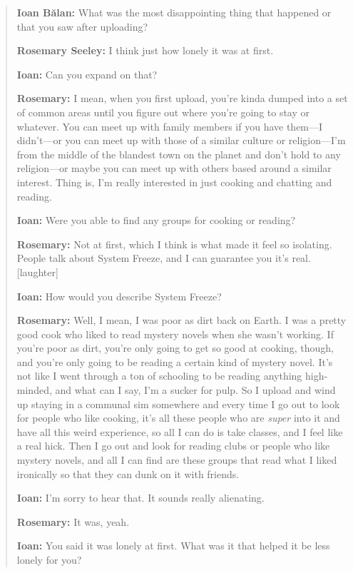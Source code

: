 \begin{quote}
\textbf{Ioan Bălan:} What was the most disappointing thing that happened or that you saw after uploading?

\textbf{Rosemary Seeley:} I think just how lonely it was at first.

\textbf{Ioan:} Can you expand on that?

\textbf{Rosemary:} I mean, when you first upload, you're kinda dumped into a set of common areas until you figure out where you're going to stay or whatever. You can meet up with family members if you have them---I didn't---or you can meet up with those of a similar culture or religion---I'm from the middle of the blandest town on the planet and don't hold to any religion---or maybe you can meet up with others based around a similar interest. Thing is, I'm really interested in just cooking and chatting and reading.

\textbf{Ioan:} Were you able to find any groups for cooking or reading?

\textbf{Rosemary:} Not at first, which I think is what made it feel so isolating. People talk about System Freeze, and I can guarantee you it's real. {[}laughter{]}

\textbf{Ioan:} How would you describe System Freeze?

\textbf{Rosemary:} Well, I mean, I was poor as dirt back on Earth. I was a pretty good cook who liked to read mystery novels when she wasn't working. If you're poor as dirt, you're only going to get so good at cooking, though, and you're only going to be reading a certain kind of mystery novel. It's not like I went through a ton of schooling to be reading anything high-minded, and what can I say, I'm a sucker for pulp. So I upload and wind up staying in a communal sim somewhere and every time I go out to look for people who like cooking, it's all these people who are \emph{super} into it and have all this weird experience, so all I can do is take classes, and I feel like a real hick. Then I go out and look for reading clubs or people who like mystery novels, and all I can find are these groups that read what I liked ironically so that they can dunk on it with friends.

\textbf{Ioan:} I'm sorry to hear that. It sounds really alienating.

\textbf{Rosemary:} It was, yeah.

\textbf{Ioan:} You said it was lonely at first. What was it that helped it be less lonely for you?


\end{quote}
